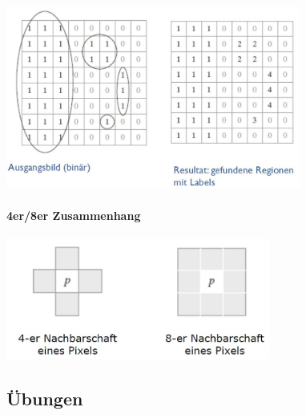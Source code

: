 \begin{center}
	
	\includegraphics[height=6cm,keepaspectratio]{images/sw01/BspCCL.JPG}
\end{center}

\paragraph{4er/8er Zusammenhang}
\begin{center}
	
	\includegraphics[height=4cm,keepaspectratio]{images/sw01/Nachbarschaften.JPG}
\end{center}


\subsection{Übungen}
